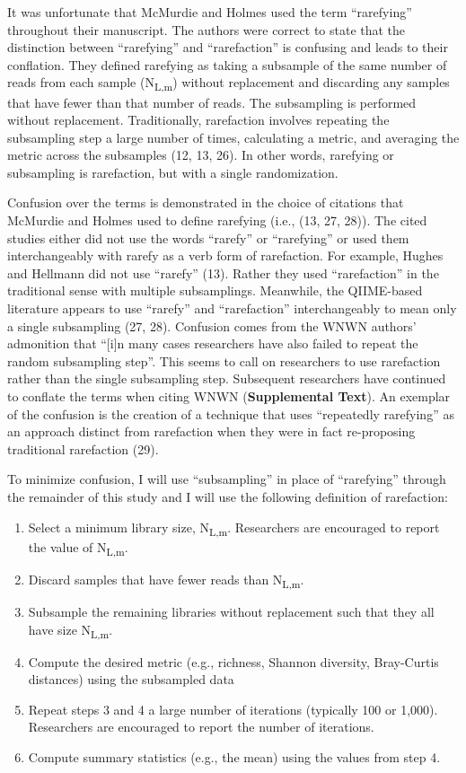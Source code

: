 \documentclass[
]{article}
\providecommand{\tightlist}{%
  \setlength{\itemsep}{0pt}\setlength{\parskip}{0pt}}
\begin{document}
It was unfortunate that McMurdie and Holmes used the term ``rarefying''
throughout their manuscript. The authors were correct to state that the
distinction between ``rarefying'' and ``rarefaction'' is confusing and
leads to their conflation. They defined rarefying as taking a subsample
of the same number of reads from each sample (N\textsubscript{L,m})
without replacement and discarding any samples that have fewer than that
number of reads. The subsampling is performed without replacement.
Traditionally, rarefaction involves repeating the subsampling step a
large number of times, calculating a metric, and averaging the metric
across the subsamples (12, 13, 26). In other words, rarefying or
subsampling is rarefaction, but with a single randomization.

Confusion over the terms is demonstrated in the choice of citations that
McMurdie and Holmes used to define rarefying (i.e., (13, 27, 28)). The
cited studies either did not use the words ``rarefy'' or ``rarefying''
or used them interchangeably with rarefy as a verb form of rarefaction.
For example, Hughes and Hellmann did not use ``rarefy'' (13). Rather
they used ``rarefaction'' in the traditional sense with multiple
subsamplings. Meanwhile, the QIIME-based literature appears to use
``rarefy'' and ``rarefaction'' interchangeably to mean only a single
subsampling (27, 28). Confusion comes from the WNWN authors' admonition
that ``{[}i{]}n many cases researchers have also failed to repeat the
random subsampling step''. This seems to call on researchers to use
rarefaction rather than the single subsampling step. Subsequent
researchers have continued to conflate the terms when citing WNWN
(\textbf{Supplemental Text}). An exemplar of the confusion is the
creation of a technique that uses ``repeatedly rarefying'' as an
approach distinct from rarefaction when they were in fact re-proposing
traditional rarefaction (29).

To minimize confusion, I will use ``subsampling'' in place of
``rarefying'' through the remainder of this study and I will use the
following definition of rarefaction:

\begin{enumerate}
\def\labelenumi{\arabic{enumi}.}
\tightlist
\item
  Select a minimum library size, N\textsubscript{L,m}. Researchers are
  encouraged to report the value of N\textsubscript{L,m}.
\item
  Discard samples that have fewer reads than N\textsubscript{L,m}.
\item
  Subsample the remaining libraries without replacement such that they
  all have size N\textsubscript{L,m}.
\item
  Compute the desired metric (e.g., richness, Shannon diversity,
  Bray-Curtis distances) using the subsampled data
\item
  Repeat steps 3 and 4 a large number of iterations (typically 100 or
  1,000). Researchers are encouraged to report the number of iterations.
\item
  Compute summary statistics (e.g., the mean) using the values from step
  4.
\end{enumerate}
\end{document}
